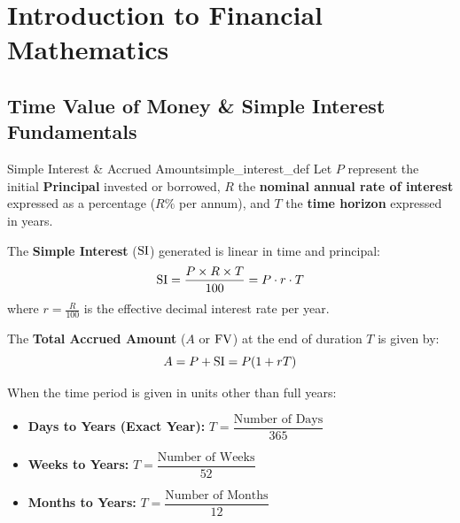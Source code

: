 \chapter{Introduction to Financial Mathematics}
\label{ch:intro_financial_mathematics}

\section{Time Value of Money \& Simple Interest Fundamentals}

\begin{definition}{Simple Interest \& Accrued Amount}{simple_interest_def}
Let $P$ represent the initial \textbf{Principal} invested or borrowed, $R$ the \textbf{nominal annual rate of interest} expressed as a percentage ($R\%$ per annum), and $T$ the \textbf{time horizon} expressed in years.

The \textbf{Simple Interest} ($\operatorname{SI}$) generated is linear in time and principal:
\begin{equation}
    \operatorname{SI} = \frac{P \times R \times T}{100} = P \cdot r \cdot T
\end{equation}
where $r = \frac{R}{100}$ is the effective decimal interest rate per year.

The \textbf{Total Accrued Amount} ($A$ or $\operatorname{FV}$) at the end of duration $T$ is given by:
\begin{equation}
    A = P + \operatorname{SI} = P(1 + r T)
\end{equation}
\end{definition}

\begin{formulabox}
When the time period is given in units other than full years:
\begin{itemize}[leftmargin=*, noitemsep]
    \item \textbf{Days to Years (Exact Year):} $T = \dfrac{\text{Number of Days}}{365}$
    \item \textbf{Weeks to Years:} $T = \dfrac{\text{Number of Weeks}}{52}$
    \item \textbf{Months to Years:} $T = \dfrac{\text{Number of Months}}{12}$
\end{itemize}
\end{formulabox}

